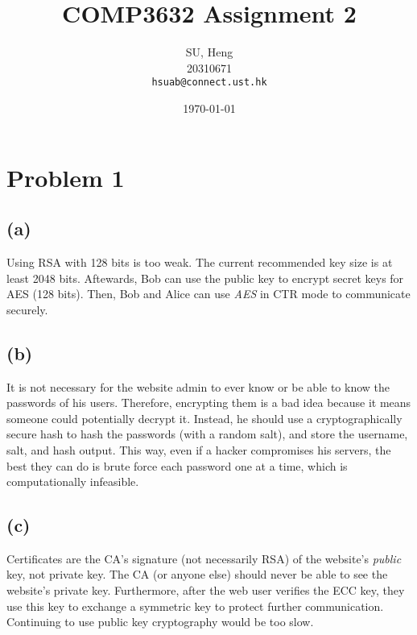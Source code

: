 \documentclass{article}
\begin{document}
\begin{titlepage}
\title{\vspace{80mm}COMP3632 Assignment 2}
\author{SU, Heng\\
  20310671\\
  \texttt{hsuab@connect.ust.hk}}
\date{\today}
\maketitle
\thispagestyle{empty}
\end{titlepage}

\section*{Problem 1}
\subsection*{(a)}
Using RSA with 128 bits is too weak. The current recommended key size is at least 2048 bits. Aftewards, Bob can use the public key to encrypt secret keys for AES (128 bits). Then, Bob and Alice can use \textit{AES} in CTR mode to communicate securely.
\subsection*{(b)}
It is not necessary for the website admin to ever know or be able to know the passwords of his users. Therefore, encrypting them is a bad idea because it means someone could potentially decrypt it. Instead, he should use a cryptographically secure hash to hash the passwords (with a random salt), and store the username, salt, and hash output. This way, even if a hacker compromises his servers, the best they can do is brute force each password one at a time, which is computationally infeasible. 
\subsection*{(c)}
Certificates are the CA's signature (not necessarily RSA) of the website's \textit{public} key, not private key. The CA (or anyone else) should never be able to see the website's private key. Furthermore, after the web user verifies the ECC key, they use this key to exchange a symmetric key to protect further communication. Continuing to use public key cryptography would be too slow. 
\end{document}
